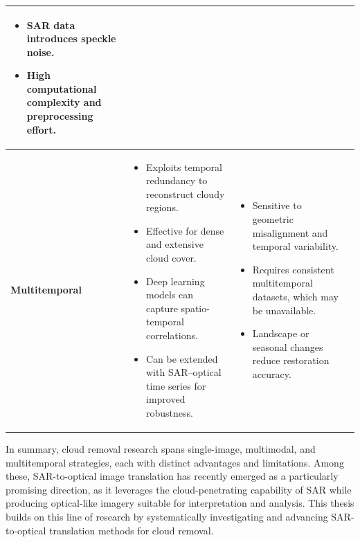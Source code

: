\begin{table}[ht]
\begin{adjustbox}{max width=\textwidth, keepaspectratio=false}
\begin{tabular}{p{2.5cm} p{6cm} p{6cm} p{3cm}}
\begin{itemize}[nosep,leftmargin=*]
  \item SAR data introduces speckle noise.
  \item High computational complexity and preprocessing effort.
\end{itemize} &
\cite{A_cGAN_fuse_sar_MS_CR} \cite{sar2opt_cGAN_Optim_oppr_limits} \cite{syn_ms_sar_opt_MT_cGAN} \cite{CR_SEN2_dRNN} \cite{GAN_gen_synt_MS} \cite{s2o_ViT_cGAN} \cite{CR_RS_GAN_s2o} \cite{s2o_Thermodynamics} \cite{c_diffusion_s2o} \cite{s2o_color_super_diff} \cite{S2MS_GAN} \cite{SAR_DeCR} \\
\midrule
\textbf{Multitemporal} &
\begin{itemize}[nosep,leftmargin=*]
  \item Exploits temporal redundancy to reconstruct cloudy regions.
  \item Effective for dense and extensive cloud cover.
  \item Deep learning models can capture spatio-temporal correlations.
  \item Can be extended with SAR–optical time series for improved robustness.
\end{itemize} &
\begin{itemize}[nosep,leftmargin=*]
  \item Sensitive to geometric misalignment and temporal variability.
  \item Requires consistent multitemporal datasets, which may be unavailable.
  \item Landscape or seasonal changes reduce restoration accuracy.
\end{itemize} &
\cite{syn_ms_sar_opt_MT_cGAN} \cite{CR_RS_spati_atten_GAN} \cite{CR_spars_repre_MT_dict_L} \cite{UnCRtainTS} \cite{assessing_MT_cGANS_s2o_crop} \cite{DiffCR} \\
\bottomrule
\end{tabular}
\end{adjustbox}
\end{table}

In summary, cloud removal research spans single-image, multimodal, and multitemporal strategies, each with distinct advantages and limitations. Among these, SAR-to-optical image translation has recently emerged as a particularly promising direction, as it leverages the cloud-penetrating capability of SAR while producing optical-like imagery suitable for interpretation and analysis. This thesis builds on this line of research by systematically investigating and advancing SAR-to-optical translation methods for cloud removal.

